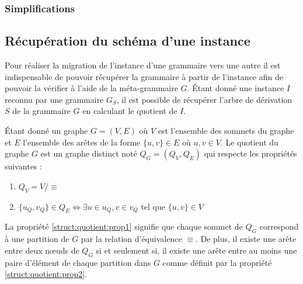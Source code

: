 \subsubsection{Simplifications}

\subsection{Récupération du schéma d'une instance}

Pour réaliser la migration de l'instance d'une grammaire vers une autre il est indispensable de pouvoir récupérer la grammaire à partir de l'instance afin de pouvoir la vérifier à l'aide de la méta-grammaire $G$.
Étant donné une instance $I$ reconnu par une grammaire $G_S$, il est possible de récupérer l'arbre de dérivation $S$ de la grammaire $G$ en calculant le quotient de $I$. 

\begin{definition}
    Étant donné un graphe $G = (V, E)$ où $V$ est l'ensemble des sommets du graphe et $E$ l'ensemble des arêtes de la forme $\{u, v\} \in E$ où $u, v \in V$.
    Le quotient du graphe $G$ est un graphe distinct noté $Q_G = (Q_V, Q_E)$ qui respecte les propriétés suivantes :
    \begin{enumerate}
        \item \label{struct:quotient:prop1} $Q_V = V / \equiv$
        \item \label{struct:quotient:prop2} $\{u_Q, v_Q\} \in Q_E \iff \exists u \in u_Q, v \in v_Q$ tel que $\{u, v\} \in V$
    \end{enumerate}
    La propriété \ref{struct:quotient:prop1} signifie que chaque sommet de $Q_G$ correspond à une partition de $G$ par la relation d'équivalence $\equiv$.
    De plus, il existe une arête entre deux nœuds de $Q_G$ si et seulement si, il existe une arête entre au moins une paire d'élément de chaque partition dans $G$ comme définit par la propriété \ref{struct:quotient:prop2}.
\end{definition}

